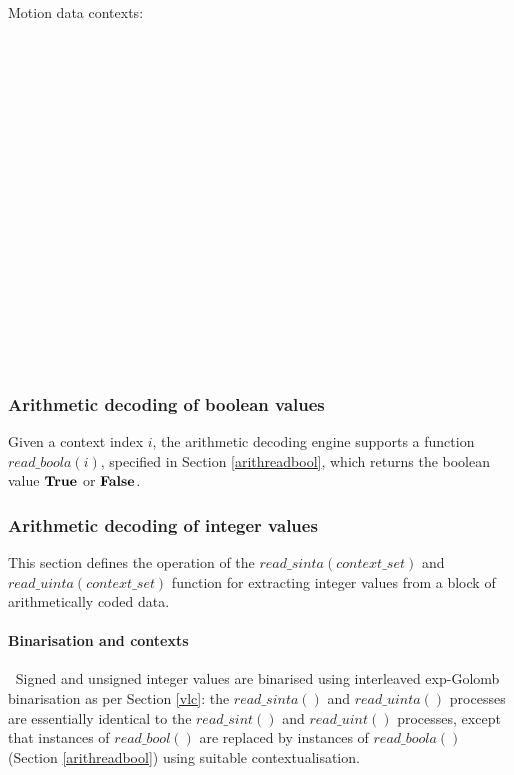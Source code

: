 Motion data contexts:

\SBSplitFollowOne\\
\SBSplitFollowTwo\\
\SBSplitData\\
\PredModeOne\\
\PredModeTwo\\
\BlockGlobal\\
\VectorFollowOne\\
\VectorFollowTwo\\
\VectorFollowThree\\
\VectorFollowFour\\
\VectorFollowFivePlus\\
\VectorData\\
\VectorSign\\
\DCFollowOne\\
\DCFollowTwoPlus\\
\DCData\\
\DCSign\\

\subsubsection{Arithmetic decoding of boolean values}

Given a context index $i$, the arithmetic decoding engine supports a function
$read\_boola(i)$, specified in Section \ref{arithreadbool}, which returns the 
boolean value $\text{\bf{True}}$ or $\text{\bf{False}}$.

\subsubsection{Arithmetic decoding of integer values}

\label{arithreadint}

This section defines the operation of the $read\_sinta(context\_set)$ and
$read\_uinta(context\_set)$ function
 for extracting integer values from a block of arithmetically coded data.

\paragraph{Binarisation and contexts}
$\ $\newline
Signed and unsigned integer values are binarised using interleaved exp-Golomb
 binarisation as per Section \ref{vlc}: the $read\_sinta()$ and $read\_uinta()$
processes are essentially identical to the 
$read\_sint()$ and $read\_uint()$ processes, except that instances of $read\_bool()$ are replaced
by instances of $read\_boola()$ (Section \ref{arithreadbool}) using suitable contextualisation. 

